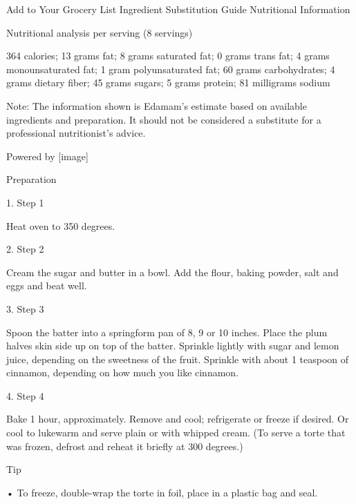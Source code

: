 Add to Your Grocery List
Ingredient Substitution Guide
Nutritional Information

Nutritional analysis per serving (8 servings)

364 calories; 13 grams fat; 8 grams saturated fat; 0 grams trans fat; 4 grams monounsaturated fat; 1
gram polyunsaturated fat; 60 grams carbohydrates; 4 grams dietary fiber; 45 grams sugars; 5 grams
protein; 81 milligrams sodium

Note: The information shown is Edamam’s estimate based on available ingredients and preparation. It
should not be considered a substitute for a professional nutritionist’s advice.

Powered by
[image]

Preparation

 1. Step 1

    Heat oven to 350 degrees.

 2. Step 2

    Cream the sugar and butter in a bowl. Add the flour, baking powder, salt and eggs and beat well.

 3. Step 3

    Spoon the batter into a springform pan of 8, 9 or 10 inches. Place the plum halves skin side up on
    top of the batter. Sprinkle lightly with sugar and lemon juice, depending on the sweetness of the
    fruit. Sprinkle with about 1 teaspoon of cinnamon, depending on how much you like cinnamon.

 4. Step 4

    Bake 1 hour, approximately. Remove and cool; refrigerate or freeze if desired. Or cool to lukewarm
    and serve plain or with whipped cream. (To serve a torte that was frozen, defrost and reheat it
    briefly at 300 degrees.)

Tip

  • To freeze, double-wrap the torte in foil, place in a plastic bag and seal.